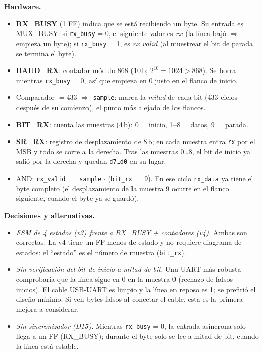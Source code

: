 \documentclass[11pt,a4paper]{article}
\newcommand{\sig}[1]{\texttt{\color{azul}#1}}
\newcommand{\bus}[1]{\texttt{#1}}
\begin{document}
\textbf{Hardware.}
\begin{itemize}
\item \textbf{RX\_BUSY} (1 FF) indica que se está recibiendo un byte. Su entrada es MUX\_BUSY: si \sig{rx\_busy} = 0, el siguiente valor es $\overline{rx}$ (la línea bajó $\Rightarrow$ empieza un byte); si \sig{rx\_busy} = 1, es $\overline{rx\_valid}$ (al muestrear el bit de parada se termina el byte).
\item \textbf{BAUD\_RX}: contador módulo 868 (10\,b; $2^{10} = 1024 > 868$). Se borra mientras \sig{rx\_busy} = 0, así que empieza en 0 justo en el flanco de inicio.
\item Comparador \textbf{$=433$} $\Rightarrow$ \sig{sample}: marca la \emph{mitad} de cada bit (433 ciclos después de su comienzo), el punto más alejado de los flancos.
\item \textbf{BIT\_RX}: cuenta las muestras (4\,b): 0 = inicio, 1–8 = datos, 9 = parada.
\item \textbf{SR\_RX}: registro de desplazamiento de 8\,b; en cada muestra entra \bus{rx} por el MSB y todo se corre a la derecha. Tras las muestras 0…8, el bit de inicio ya salió por la derecha y quedan \bus{d7…d0} en su lugar.
\item AND: \sig{rx\_valid} $=$ \sig{sample} $\cdot$ (\bus{bit\_rx} $= 9$). En ese ciclo \bus{rx\_data} ya tiene el byte completo (el desplazamiento de la muestra 9 ocurre en el flanco siguiente, cuando el byte ya se guardó).
\end{itemize}

\textbf{Decisiones y alternativas.}
\begin{itemize}
\item \emph{FSM de 4 estados (v3) frente a RX\_BUSY + contadores (v4).} Ambas son correctas. La v4 tiene un FF menos de estado y no requiere diagrama de estados: el ``estado'' es el número de muestra (\bus{bit\_rx}).
\item \emph{Sin verificación del bit de inicio a mitad de bit.} Una UART más robusta comprobaría que la línea sigue en 0 en la muestra 0 (rechazo de falsos inicios). El cable USB-UART es limpio y la línea en reposo es 1; se prefirió el diseño mínimo. Si ven bytes falsos al conectar el cable, esta es la primera mejora a considerar.
\item \emph{Sin sincronizador (D15).} Mientras \sig{rx\_busy} = 0, la entrada asíncrona solo llega a un FF (RX\_BUSY); durante el byte solo se lee a mitad de bit, cuando la línea está estable.
\end{itemize}
\end{document}
